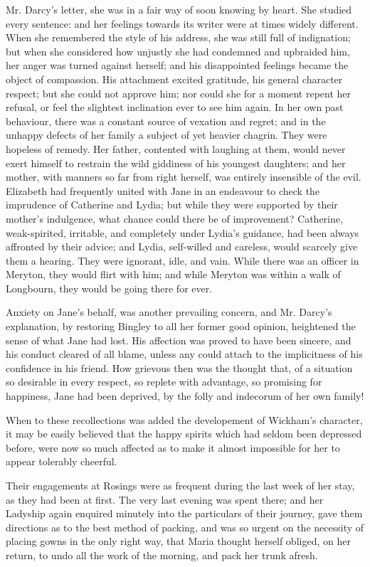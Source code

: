 Mr. Darcy’s letter, she was in a fair way of soon knowing
by heart. She studied every sentence: and her feelings
towards its writer were at times widely different. When
she remembered the style of his address, she was still
full of indignation; but when she considered how unjustly
she had condemned and upbraided him, her anger was
turned against herself; and his disappointed feelings
became the object of compassion. His attachment excited
gratitude, his general character respect; but she could
not approve him; nor could she for a moment repent
her refusal, or feel the slightest inclination ever to see
him again. In her own past behaviour, there was a constant
source of vexation and regret; and in the unhappy
defects of her family a subject of yet heavier chagrin.
They were hopeless of remedy. Her father, contented
with laughing at them, would never exert himself to
restrain the wild giddiness of his youngest daughters; and
her mother, with manners so far from right herself, was
entirely insensible of the evil. Elizabeth had frequently
united with Jane in an endeavour to check the imprudence
of Catherine and Lydia; but while they were supported
by their mother’s indulgence, what chance could there be
of improvement? Catherine, weak-spirited, irritable, and
completely under Lydia’s guidance, had been always
affronted by their advice; and Lydia, self-willed and
careless, would scarcely give them a hearing. They were
ignorant, idle, and vain. While there was an officer in
Meryton, they would flirt with him; and while Meryton
was within a walk of Longbourn, they would be going
there for ever.

Anxiety on Jane’s behalf, was another prevailing concern,
and Mr. Darcy’s explanation, by restoring Bingley
to all her former good opinion, heightened the sense of
what Jane had lost. His affection was proved to have
been sincere, and his conduct cleared of all blame, unless
any could attach to the implicitness of his confidence in
his friend. How grievous then was the thought that,
of a situation so desirable in every respect, so replete
with advantage, so promising for happiness, Jane had
been deprived, by the folly and indecorum of her own
family!

When to these recollections was added the developement
of Wickham’s character, it may be easily believed that
the happy spirits which had seldom been depressed before,
were now so much affected as to make it almost impossible
for her to appear tolerably cheerful.

Their engagements at Rosings were as frequent during
the last week of her stay, as they had been at first. The
very last evening was spent there; and her Ladyship
again enquired minutely into the particulars of their
journey, gave them directions as to the best method of
packing, and was so urgent on the necessity of placing
gowns in the only right way, that Maria thought herself
obliged, on her return, to undo all the work of the morning,
and pack her trunk afresh.

